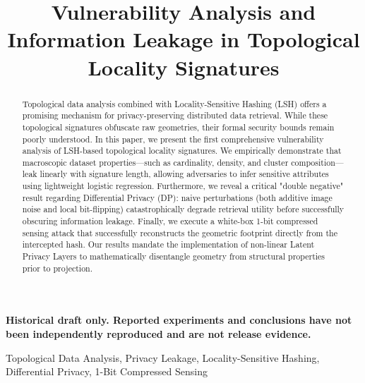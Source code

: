 \documentclass[10pt, conference]{IEEEtran}
\begin{document}
\title{Vulnerability Analysis and Information Leakage in Topological Locality Signatures}

\author{
}

\maketitle

\begin{center}
\textbf{Historical draft only. Reported experiments and conclusions have not been independently reproduced and are not release evidence.}
\end{center}

\begin{abstract}
Topological data analysis combined with Locality-Sensitive Hashing (LSH) offers a promising mechanism for privacy-preserving distributed data retrieval. While these topological signatures obfuscate raw geometries, their formal security bounds remain poorly understood. In this paper, we present the first comprehensive vulnerability analysis of LSH-based topological locality signatures. We empirically demonstrate that macroscopic dataset properties—such as cardinality, density, and cluster composition—leak linearly with signature length, allowing adversaries to infer sensitive attributes using lightweight logistic regression. Furthermore, we reveal a critical "double negative" result regarding Differential Privacy (DP): naive perturbations (both additive image noise and local bit-flipping) catastrophically degrade retrieval utility before successfully obscuring information leakage. Finally, we execute a white-box 1-bit compressed sensing attack that successfully reconstructs the geometric footprint directly from the intercepted hash. Our results mandate the implementation of non-linear Latent Privacy Layers to mathematically disentangle geometry from structural properties prior to projection.
\end{abstract}

\begin{IEEEkeywords}
Topological Data Analysis, Privacy Leakage, Locality-Sensitive Hashing, Differential Privacy, 1-Bit Compressed Sensing
\end{IEEEkeywords}
\end{document}
